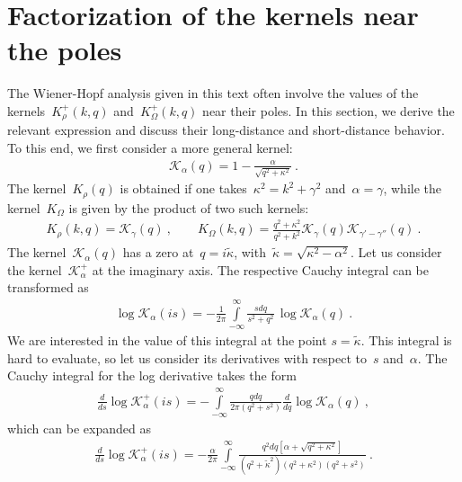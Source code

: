 \documentclass[preprint,aps,eqsecnum, prb]{revtex4-1}
\newcommand{\fplus}[1]{{#1}^{+}}
\begin{document}
\section{Factorization of the kernels near the poles}

The Wiener-Hopf analysis given in this text often involve the
values of the kernels~$\fplus{K}_\rho(k, q)$ and~$\fplus{K}_\Omega(k, q)$ near
their poles. In this section, we derive the relevant expression
and discuss their long-distance and short-distance behavior.
To this end, we first consider a more general kernel:
\begin{align}
  \mathcal{K}_\alpha(q) = 1 - \frac{\alpha}{\sqrt{q^2 + \kappa^2}}\ .
\end{align}
The kernel~$K_\rho(q)$ is obtained if one takes~$\kappa^2 = k^2 + \gamma^2$
and~$\alpha = \gamma$, while the kernel~$K_\Omega$ is given by
the product of two such kernels:
\begin{align}
  \label{eq:appA-representation}
  K_\rho(k, q) = \mathcal{K}_\gamma(q)\ , \qquad
  K_\Omega(k, q) = \frac{q^2 + \kappa^2}{q^2 + k^2}
 \mathcal{K}_{\gamma}(q) \mathcal{K}_{\gamma' - \gamma''}(q)\ .
\end{align}
The kernel~$\mathcal{K}_\alpha(q)$ has a zero at~$q = i {\tilde \kappa}$,
with~${\tilde \kappa} = \sqrt{\kappa^2 - \alpha^2}$.
Let us consider the kernel~$\fplus{\mathcal{K}}_\alpha$ at the imaginary axis.
The respective Cauchy integral can be transformed as
\begin{align}
  \log \mathcal{K}_{\alpha}(is) = - \frac{1}{2\pi}
  \int\limits_{-\infty}^{\infty}
  \frac{s dq}{s^2 + q^2} \, \log \mathcal{K}_{\alpha}(q)\ .
\end{align}
We are interested in the value of this integral at the point
$s = {\tilde\kappa}$.
This integral is hard to evaluate, so let us consider its derivatives
with respect to~$s$ and~$\alpha$.
The Cauchy integral for the log derivative takes the form
\begin{align}
  \frac{d}{ds} \log \fplus{\mathcal{K}}_{\alpha}(is)
  = -\int\limits_{-\infty}^{\infty} \frac{qdq}{2\pi (q^2 + s^2)}
  \frac{d}{dq} \log \mathcal{K}_\alpha(q)\ ,
\end{align}
which can be expanded as
\begin{align}
  \frac{d}{ds} \log \fplus{\mathcal{K}}_{\alpha}(is)
  = - \frac{\alpha}{2\pi}
  \int\limits_{-\infty}^{\infty}
  \frac{q^2 dq \left[\alpha + \sqrt{q^2 + \kappa^2}\right]}{
     (q^2 + {\tilde \kappa}^2) (q^2 + \kappa^2) (q^2 + s^2)
  }\ .
\end{align}
\end{document}
